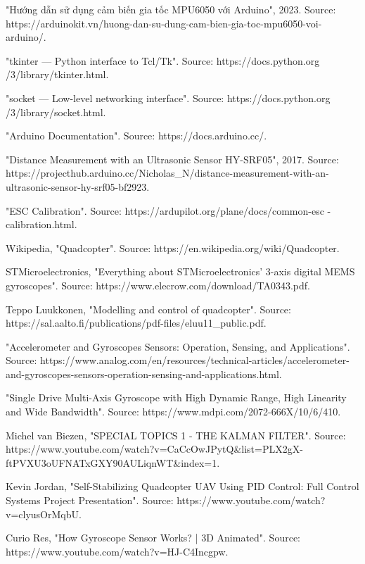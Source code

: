 \begin{thebibliography}{99}
 "Hướng dẫn sử dụng cảm biến gia tốc MPU6050 với Arduino", 2023. Source: https://arduinokit.vn/huong-dan-su-dung-cam-bien-gia-toc-mpu6050-voi-arduino/.

 "tkinter — Python interface to Tcl/Tk". Source: https://docs.python.org /3/library/tkinter.html.

 "socket — Low-level networking interface". Source: https://docs.python.org /3/library/socket.html.

 "Arduino Documentation". Source: https://docs.arduino.cc/.

 "Distance Measurement with an Ultrasonic Sensor HY-SRF05", 2017. Source: https://projecthub.arduino.cc/Nicholas\_N/distance-measurement-with-an-ultrasonic-sensor-hy-srf05-bf2923.

 "ESC Calibration". Source: https://ardupilot.org/plane/docs/common-esc -calibration.html.

 Wikipedia, "Quadcopter". Source: https://en.wikipedia.org/wiki/Quadcopter.

 STMicroelectronics, "Everything about STMicroelectronics’ 3-axis digital MEMS gyroscopes". Source: https://www.elecrow.com/download/TA0343.pdf.

 Teppo Luukkonen, "Modelling and control of quadcopter". Source: https://sal.aalto.fi/publications/pdf-files/eluu11\_public.pdf.

 "Accelerometer and Gyroscopes Sensors: Operation, Sensing, and Applications". Source: https://www.analog.com/en/resources/technical-articles/accelerometer-and-gyroscopes-sensors-operation-sensing-and-applications.html.

 "Single Drive Multi-Axis Gyroscope with High Dynamic Range, High Linearity and Wide Bandwidth". Source: https://www.mdpi.com/2072-666X/10/6/410.

 Michel van Biezen, "SPECIAL TOPICS 1 - THE KALMAN FILTER". Source: https://www.youtube.com/watch?v=CaCcOwJPytQ\&list=PLX2gX-ftPVXU3oUFNATxGXY90AULiqnWT\&index=1.

 Kevin Jordan, "Self-Stabilizing Quadcopter UAV Using PID Control: Full Control Systems Project Presentation". Source: https://www.youtube.com/watch?v=clyusOrMqbU.

 Curio Res, "How Gyroscope Sensor Works? | 3D Animated". Source: https://www.youtube.com/watch?v=HJ-C4Incgpw.


\end{thebibliography}
